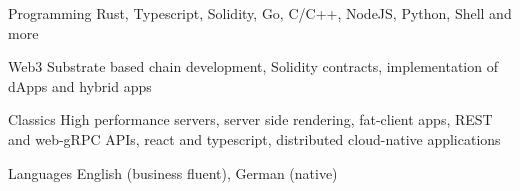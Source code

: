 


\begin{cvskills}


\cvskill
{Programming} %
{Rust, Typescript, Solidity, Go, C/C++, NodeJS, Python, Shell and more} %


\cvskill
{Web3} %
{Substrate based chain development, Solidity contracts, implementation of dApps and hybrid apps} %

\cvskill
{Classics} %
{High performance servers, server side rendering, fat-client apps, REST and web-gRPC APIs, react and typescript, distributed cloud-native applications} %


\cvskill
{Languages} %
{English (business fluent), German (native)} %


\end{cvskills}